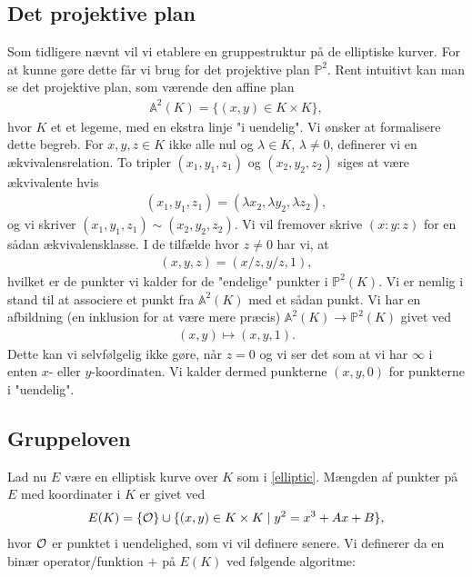 \subsection{Det projektive plan}
Som tidligere nævnt vil vi etablere en gruppestruktur på de elliptiske
kurver. For at kunne gøre dette får vi brug for det projektive plan 
$\mathbb{P}^2$. Rent intuitivt kan man se det projektive plan, som
værende den affine plan 
\begin{align*}
	\mathbb{A}^2(K) = \{ (x, y) \in K \times K \},
\end{align*}
hvor $K$ et et legeme, med en ekstra linje "i uendelig". 
Vi ønsker at formalisere dette begreb. 
For $x, y, z \in K$ ikke alle nul og $\lambda \in K$, $\lambda \neq 0$, 
definerer vi en ækvivalensrelation. To tripler $(x_1, y_1, z_1)$ og 
$(x_2, y_2, z_2)$ siges at være ækvivalente hvis 
\begin{align*}
	(x_1, y_1, z_1) = (\lambda x_2, \lambda y_2, \lambda z_2),
\end{align*}
og vi skriver $(x_1, y_1, z_1) \sim (x_2, y_2, z_2)$. Vi vil fremover skrive
$(x:y:z)$ for en sådan ækvivalensklasse. I de tilfælde hvor $z \neq 0$ har vi, at
\begin{align*}
	(x, y, z) = (x/z, y/z, 1),
\end{align*}
hvilket er de punkter vi kalder for de "endelige" punkter i $\mathbb{P}^2(K)$.
Vi er nemlig i stand til at associere et punkt fra $\mathbb{A}^2(K)$ med et sådan
punkt. Vi har en afbildning (en inklusion for at være mere præcis) 
$\mathbb{A}^2(K) \to \mathbb{P}^2(K)$ givet ved
\begin{align*}
	(x, y) \mapsto (x, y, 1).
\end{align*}
Dette kan vi selvfølgelig ikke gøre, når $z=0$ og vi ser det som at vi
har $\infty$ i enten $x$- eller $y$-koordinaten. Vi kalder dermed punkterne
$(x, y, 0)$ for punkterne i "uendelig".








\subsection{Gruppeloven}
Lad nu $E$ være en elliptisk kurve over $K$ som i \ref{elliptic}. Mængden
af punkter på $E$ med koordinater i $K$ er givet ved
\begin{align*}
	E(K) = \{ \mathcal{O} \} \cup \{ (x, y) \in K \times K \mid y^2 = x^3 + Ax + B \},
\end{align*}
hvor $\mathcal{O}$ er punktet i uendelighed, som vi vil definere senere. Vi definerer
da en binær operator/funktion $+$ på $E(K)$ ved følgende algoritme:

